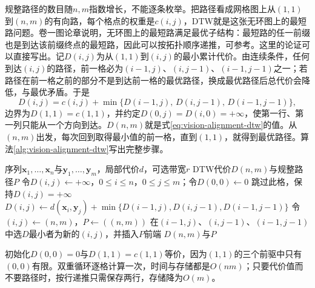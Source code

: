 规整路径的数目随$n,m$指数增长，不能逐条枚举。把路径看成网格图上从$(1,1)$到$(n,m)$的有向路，每个格点的权重是$c(i,j)$，DTW就是这张无环图上的最短路问题。卷一图论章说明，无环图上的最短路满足最优子结构：最短路的任一前缀也是到达该前缀终点的最短路，因此可以按拓扑顺序递推，可参考。这里的论证可以直接写出。记$D(i,j)$为从$(1,1)$到$(i,j)$的最小累计代价。由连续条件，任何到达$(i,j)$的路径，前一格必为$(i-1,j)$、$(i,j-1)$、$(i-1,j-1)$之一；若路径在前一格之前的部分不是到达前一格的最优路径，换成最优路径后总代价会降低，与最优矛盾。于是
\begin{equation}
  D(i,j)=c(i,j)+\min\bigl\{D(i-1,j),\,D(i,j-1),\,D(i-1,j-1)\bigr\},
  \label{eq:vision-alignment-dtw-recursion}
\end{equation}
边界为$D(1,1)=c(1,1)$，并约定$D(0,j)=D(i,0)=+\infty$，使第一行、第一列只能从一个方向到达。$D(n,m)$就是式\eqref{eq:vision-alignment-dtw}的值。从$(n,m)$出发，每次回到取得最小值的前一格，直到$(1,1)$，就得到最优路径。算法\ref{alg:vision-alignment-dtw}写出完整步骤。

\begin{algorithm}[动态时间规整]
  \label{alg:vision-alignment-dtw}
  \begin{algorithmic}[1]
    \Require 序列$\bm x_1,\ldots,\bm x_n$与$\bm y_1,\ldots,\bm y_m$，局部代价$d$，可选带宽$r$
    \Ensure DTW代价$D(n,m)$与规整路径$P$
    \State 令$D(i,j)\gets+\infty$，$0\leq i\leq n$，$0\leq j\leq m$；令$D(0,0)\gets0$
          \State 跳过此格，保持$D(i,j)=+\infty$
        \Else
          \State $D(i,j)\gets d(\bm x_i,\bm y_j)+\min\{D(i-1,j),D(i,j-1),D(i-1,j-1)\}$
        \EndIf
      \EndFor
    \EndFor
    \State 令$(i,j)\gets(n,m)$，$P\gets((n,m))$
      \State 在$(i-1,j)$、$(i,j-1)$、$(i-1,j-1)$中选$D$最小者为新的$(i,j)$，并插入$P$前端
    \EndWhile
    \State \Return $D(n,m)$与$P$
  \end{algorithmic}
\end{algorithm}

初始化$D(0,0)=0$与$D(1,1)=c(1,1)$等价，因为$(1,1)$的三个前驱中只有$(0,0)$有限。双重循环逐格计算一次，时间与存储都是$O(nm)$；只要代价值而不要路径时，按行递推只需保存两行，存储降为$O(m)$。

